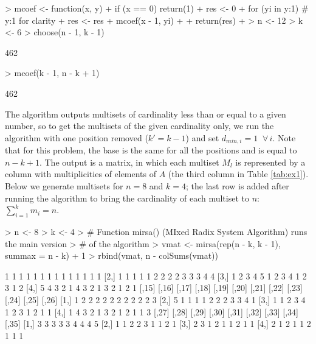 \documentclass[12pt]{article}
\begin{document}
\begin{Schunk}
\begin{Sinput}
> mcoef <- function(x, y) {
+   if (x == 0) return(1)
+   res <- 0
+   for (yi in y:1) {                     # y:1 for clarity
+     res <- res + mcoef(x - 1, yi)
+   }
+   return(res)
+ }
> n <- 12
> k <- 6
> choose(n - 1, k - 1)
\end{Sinput}
\begin{Soutput}
[1] 462
\end{Soutput}
\begin{Sinput}
> mcoef(k - 1, n - k + 1)
\end{Sinput}
\begin{Soutput}
[1] 462
\end{Soutput}
\end{Schunk}

The algorithm outputs multisets of cardinality less than or equal to a given number, so to get the multisets of the given cardinality only, we run the algorithm with one position removed ($k' = k - 1$) and set $d_{min, i} = 1 \;\; \forall \, i$. Note that for this problem, the base is the same for all the positions and is equal to $n - k + 1$. The output is a matrix, in which each multiset $M_l$ is represented by a column with multiplicities of elements of $A$ (the third column in Table \ref{tab:ex1}). Below we generate multisets for $n = 8$ and $k = 4$; the last row is added after running the algorithm to bring the cardinality of each multiset to $n$: $\sum_{i = 1}^k m_i = n$.

\begin{Schunk}
\begin{Sinput}
> n <- 8
> k <- 4
> # Function mirsa() (MIxed Radix System Algorithm) runs the main version 
> # of the algorithm 
> vmat <- mirsa(rep(n - k, k - 1), summax = n - k) + 1
> rbind(vmat, n - colSums(vmat))
\end{Sinput}
\begin{Soutput}
     [,1] [,2] [,3] [,4] [,5] [,6] [,7] [,8] [,9] [,10] [,11] [,12] [,13] [,14]
[1,]    1    1    1    1    1    1    1    1    1     1     1     1     1     1
[2,]    1    1    1    1    1    2    2    2    2     3     3     3     4     4
[3,]    1    2    3    4    5    1    2    3    4     1     2     3     1     2
[4,]    5    4    3    2    1    4    3    2    1     3     2     1     2     1
     [,15] [,16] [,17] [,18] [,19] [,20] [,21] [,22] [,23] [,24] [,25] [,26]
[1,]     1     2     2     2     2     2     2     2     2     2     2     3
[2,]     5     1     1     1     1     2     2     2     3     3     4     1
[3,]     1     1     2     3     4     1     2     3     1     2     1     1
[4,]     1     4     3     2     1     3     2     1     2     1     1     3
     [,27] [,28] [,29] [,30] [,31] [,32] [,33] [,34] [,35]
[1,]     3     3     3     3     3     4     4     4     5
[2,]     1     1     2     2     3     1     1     2     1
[3,]     2     3     1     2     1     1     2     1     1
[4,]     2     1     2     1     1     2     1     1     1
\end{Soutput}
\end{Schunk}
\end{document}
